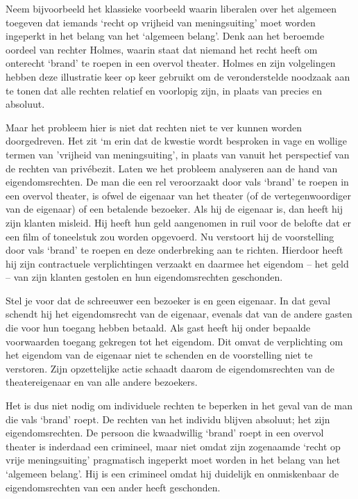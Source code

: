 \documentclass[
  a5paper,
  smalldemyvopaper,10pt,twoside,onecolumn,openright,extrafontsizes,hidelinks]{memoir}
\begin{document}
Neem bijvoorbeeld het klassieke voorbeeld waarin liberalen over het
algemeen toegeven dat iemands `recht op vrijheid van meningsuiting' moet
worden ingeperkt in het belang van het `algemeen belang'. Denk aan het
beroemde oordeel van rechter Holmes, waarin staat dat niemand het recht
heeft om onterecht `brand' te roepen in een overvol theater. Holmes en
zijn volgelingen hebben deze illustratie keer op keer gebruikt om de
veronderstelde noodzaak aan te tonen dat alle rechten relatief en
voorlopig zijn, in plaats van precies en absoluut.

Maar het probleem hier is niet dat rechten niet te ver kunnen worden
doorgedreven. Het zit `m erin dat de kwestie wordt besproken in vage en
wollige termen van 'vrijheid van meningsuiting', in plaats van vanuit
het perspectief van de rechten van privébezit. Laten we het probleem
analyseren aan de hand van eigendomsrechten. De man die een rel
veroorzaakt door vals `brand' te roepen in een overvol theater, is ofwel
de eigenaar van het theater (of de vertegenwoordiger van de eigenaar) of
een betalende bezoeker. Als hij de eigenaar is, dan heeft hij zijn
klanten misleid. Hij heeft hun geld aangenomen in ruil voor de belofte
dat er een film of toneelstuk zou worden opgevoerd. Nu verstoort hij de
voorstelling door vals `brand' te roepen en deze onderbreking aan te
richten. Hierdoor heeft hij zijn contractuele verplichtingen verzaakt en
daarmee het eigendom -- het geld -- van zijn klanten gestolen en hun
eigendomsrechten geschonden.

Stel je voor dat de schreeuwer een bezoeker is en geen eigenaar. In dat
geval schendt hij het eigendomsrecht van de eigenaar, evenals dat van de
andere gasten die voor hun toegang hebben betaald. Als gast heeft hij
onder bepaalde voorwaarden toegang gekregen tot het eigendom. Dit omvat
de verplichting om het eigendom van de eigenaar niet te schenden en de
voorstelling niet te verstoren. Zijn opzettelijke actie schaadt daarom
de eigendomsrechten van de theatereigenaar en van alle andere bezoekers.

Het is dus niet nodig om individuele rechten te beperken in het geval
van de man die vals `brand' roept. De rechten van het individu blijven
absoluut; het zijn eigendomsrechten. De persoon die kwaadwillig `brand'
roept in een overvol theater is inderdaad een crimineel, maar niet omdat
zijn zogenaamde `recht op vrije meningsuiting' pragmatisch ingeperkt
moet worden in het belang van het `algemeen belang'. Hij is een
crimineel omdat hij duidelijk en onmiskenbaar de eigendomsrechten van
een ander heeft geschonden.
\end{document}
